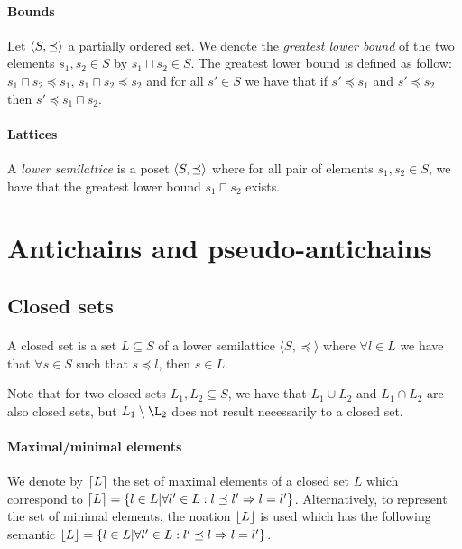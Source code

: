 \documentclass[letterpaper]{memoir}
\DeclarePairedDelimiter{\ceil}{\lceil}{\rceil}
\DeclarePairedDelimiter{\floor}{\lfloor}{\rfloor}
\DeclarePairedDelimiter{\tuple}{\langle}{\rangle}
\begin{document}
\paragraph{Bounds} Let $\tuple{S, \preceq}$ a partially ordered set.
We denote the \textit{greatest lower bound} of the two elements $s_1, s_2 \in S$
by $s_1 \sqcap s_2 \in S$.
The greatest lower bound is defined as follow:
$s_1 \sqcap s_2 \preceq s_1$,
$s_1 \sqcap s_2 \preceq s_2$ and for all $s' \in S$ we have that
if $s' \preceq s_1$ and $s' \preceq s_2$ then $s' \preceq s_1 \sqcap s_2$.


\paragraph{Lattices} A \textit{lower semilattice} is a poset
$\tuple{S, \preceq}$ where for all pair of elements $s_1, s_2 \in S$,
we have that the greatest lower bound $s_1 \sqcap s_2$ exists.

\section{Antichains and pseudo-antichains}

\subsection{Closed sets}

\paragraph{}


A closed set is a set $L \subseteq S$
of a lower semilattice $\langle S, \preceq \rangle$
where $\forall l \in L$ we have that $\forall s \in S$ such that
$s \preceq l$, then $s \in L$.

Note that for two closed sets $L_1, L_2 \subseteq S$, we have that
$L_1 \cup L_2$ and $L_1 \cap L_2$ are also closed sets,
but $L_1 \setminus \L_2$ does not result necessarily to a closed set.

\paragraph{Maximal/minimal elements} We denote by $\ceil{L}$
the set of maximal elements of a closed set $L$ which
correspond to $\ceil{L} = \{ l \in L | \forall l' \in L :  l \preceq l'
 \Rightarrow l = l' \}$. Alternatively, to represent the set of minimal
 elements, the noation $\floor{L}$ is used which has the following semantic
$\floor{L} = \{ l \in L | \forall l' \in L :  l' \preceq l
 \Rightarrow l = l' \}$.
\end{document}
